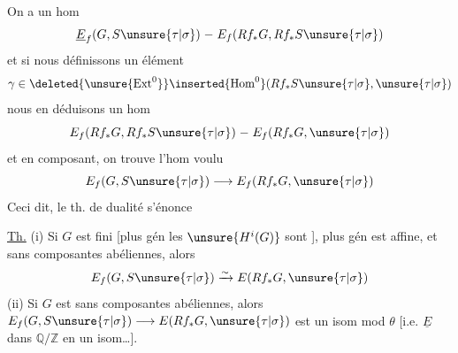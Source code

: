 On a un hom 
\[
\underline E_f(G,S\unsure{\tau|\sigma})\mathrel{-}E_f(Rf_*G,Rf_*S\unsure{\tau|\sigma})
\]
et si nous définissons un élément
\[
\gamma\in\deleted{\unsure{\operatorname{Ext}^0}}\inserted{\operatorname{Hom}^0}(Rf_*S\unsure{\tau|\sigma},\unsure{\tau|\sigma})
\]
nous en déduisons un  hom
\[
E_f(Rf_*G,Rf_*S\unsure{\tau|\sigma})\mathrel{-}E_f(Rf_*G,\unsure{\tau|\sigma})
\]
et en composant, on trouve l'hom voulu
\[
E_f(G,S\unsure{\tau|\sigma})\longrightarrow E_f(Rf_*G,\unsure{\tau|\sigma})
\]
Ceci dit, le th. de dualité s'énonce

\uline{Th.} (i) Si $G$ est  fini [plus gén les $\unsure{H^i(G)}$ sont ],  plus gén est affine, et sans composantes abéliennes, alors
\[
E_f(G,S\unsure{\tau|\sigma})\xrightarrow{\sim}E(Rf_*G,\unsure{\tau|\sigma})
\]
(ii) Si $G$ est  sans composantes abéliennes, alors $E_f(G,S\unsure{\tau|\sigma})\longrightarrow E(Rf_*G,\unsure{\tau|\sigma})$ est un isom mod $\theta$ [i.e.  $\underline E$ dans $\mathbb Q/\mathbb Z$   en un isom\ldots].

